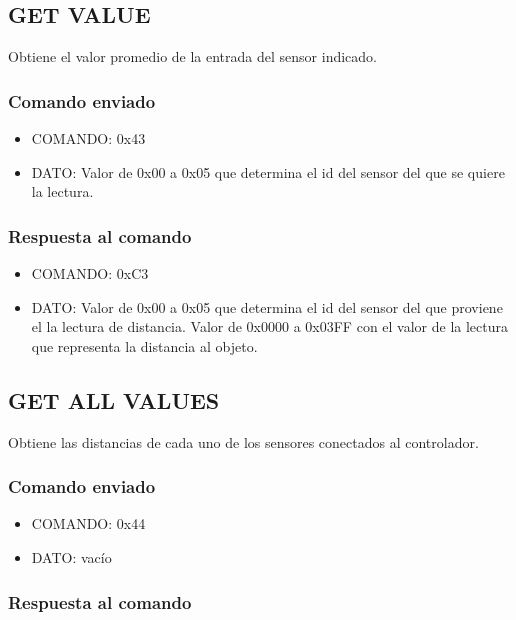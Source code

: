 \documentclass[a4paper,10pt]{article}
\begin{document}
\subsection{GET VALUE}
\label{get_value_us}

Obtiene el valor promedio de la entrada del sensor indicado.

\subsubsection*{Comando enviado}

\begin{itemize}
	\item{COMANDO:} 0x43
	\item{DATO:} Valor de 0x00 a 0x05 que determina el id del sensor del que se quiere la lectura.
\end{itemize}

\subsubsection*{Respuesta al comando}

\begin{itemize}
	\item{COMANDO:} 0xC3
	\item{DATO:} Valor de 0x00 a 0x05 que determina el id del sensor del que proviene el la lectura de distancia.
	Valor de 0x0000 a 0x03FF con el valor de la lectura que representa la distancia al objeto.
\end{itemize}

\subsection{GET ALL VALUES}
\label{get_all_values_us}

Obtiene las distancias de cada uno de los sensores conectados al controlador.

\subsubsection*{Comando enviado}

\begin{itemize}
	\item{COMANDO:} 0x44
	\item{DATO:} vac\'io
\end{itemize}

\subsubsection*{Respuesta al comando}
\end{document}
